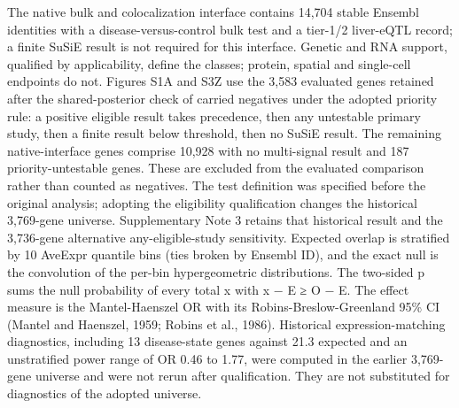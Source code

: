 The native bulk and colocalization interface contains 14,704 stable Ensembl identities with a disease-versus-control bulk test and a tier-1/2 liver-eQTL record; a finite SuSiE result is not required for this interface. Genetic and RNA support, qualified by applicability, define the classes; protein, spatial and single-cell endpoints do not. Figures S1A and S3Z use the 3,583 evaluated genes retained after the shared-posterior check of carried negatives under the adopted priority rule: a positive eligible result takes precedence, then any untestable primary study, then a finite result below threshold, then no SuSiE result. The remaining native-interface genes comprise 10,928 with no multi-signal result and 187 priority-untestable genes. These are excluded from the evaluated comparison rather than counted as negatives. The test definition was specified before the original analysis; adopting the eligibility qualification changes the historical 3,769-gene universe. Supplementary Note 3 retains that historical result and the 3,736-gene alternative any-eligible-study sensitivity. Expected overlap is stratified by 10 AveExpr quantile bins (ties broken by Ensembl ID), and the exact null is the convolution of the per-bin hypergeometric distributions. The two-sided p sums the null probability of every total x with \textbar x − E\textbar{} ≥ \textbar O − E\textbar. The effect measure is the Mantel-Haenszel OR with its Robins-Breslow-Greenland 95\% CI (Mantel and Haenszel, 1959; Robins et al., 1986). Historical expression-matching diagnostics, including 13 disease-state genes against 21.3 expected and an unstratified power range of OR 0.46 to 1.77, were computed in the earlier 3,769-gene universe and were not rerun after qualification. They are not substituted for diagnostics of the adopted universe.

